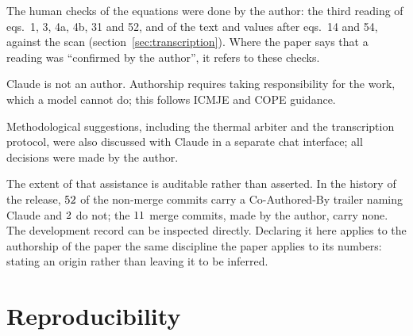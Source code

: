 The human checks of the equations were done by the author: the third reading of eqs.~1, 3, 4a, 4b, 31 and 52, and of the text and values after eqs.~14 and 54, against the scan (section~\ref{sec:transcription}). Where the paper says that a reading was ``confirmed by the author'', it refers to these checks.

Claude is not an author. Authorship requires taking responsibility for the work, which a model cannot do; this follows ICMJE and COPE guidance.

Methodological suggestions, including the thermal arbiter and the transcription protocol, were also discussed with Claude in a separate chat interface; all decisions were made by the author.

The extent of that assistance is auditable rather than asserted. In the history of the release, $52$ of the non-merge commits carry a Co-Authored-By trailer naming Claude and $2$ do not; the $11$ merge commits, made by the author, carry none. The development record can be inspected directly. Declaring it here applies to the authorship of the paper the same discipline the paper applies to its numbers: stating an origin rather than leaving it to be inferred.

\section{Reproducibility}

